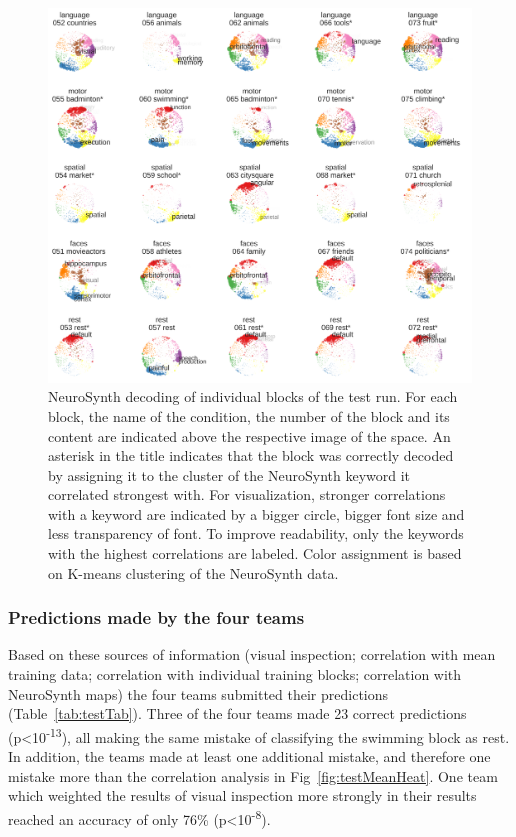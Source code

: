 \documentclass[fleqn,10pt]{SelfArx} %
\begin{document}
\begin{figure}[htbp]
	\begin{minipage}{\textwidth}
		\renewcommand{\familydefault}{\sfdefault}\normalfont
		\centering
		\includegraphics[width=\columnwidth]{./figs/fig9_nsSpacesTest.png}
				\vspace*{-3mm}
		\caption{NeuroSynth decoding of individual blocks of the test run. For each block, the name of the condition, the number of the block and its content are indicated above the respective image of the space. An asterisk in the title indicates that the block was correctly decoded by assigning it to the cluster of the NeuroSynth keyword it correlated strongest with. For visualization, stronger correlations with a keyword are indicated by a bigger circle, bigger font size and less transparency of font. To improve readability, only the keywords with the highest correlations are labeled. Color assignment is based on K-means clustering of the NeuroSynth data.}%
		\label{fig:testNs}
	\end{minipage}
\end{figure}

\subsubsection*{Predictions made by the four teams}

Based on these sources of information (visual inspection; correlation with mean training data; correlation with individual training blocks; correlation with NeuroSynth maps) the four teams submitted their predictions (Table~\ref{tab:testTab}). Three of the four teams made 23 correct predictions (p<10\textsuperscript{-13}), all making the same mistake of classifying the swimming block as rest. In addition, the teams made at least one additional mistake, and therefore one mistake more than the correlation analysis in Fig~\ref{fig:testMeanHeat}. One team which weighted the results of visual inspection more strongly in their results reached an accuracy of only 76\% (p<10\textsuperscript{-8}).
\end{document}

